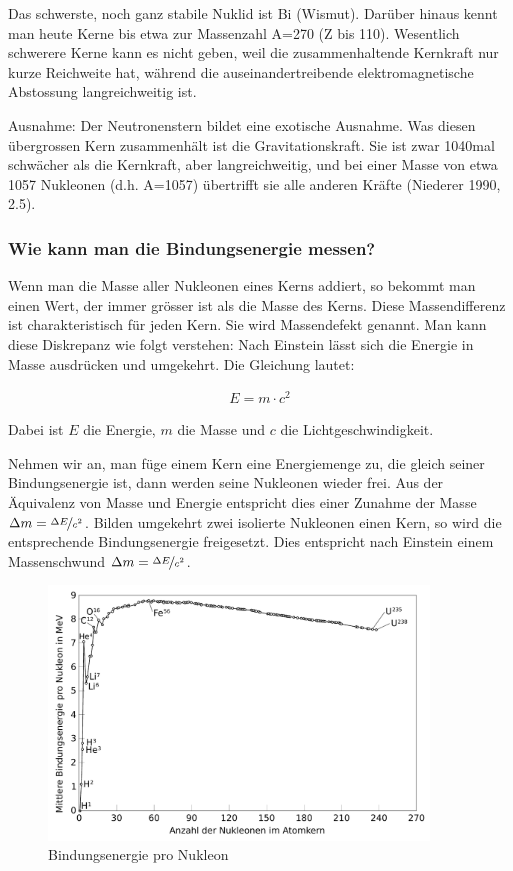\documentclass[12pt,a4paper,twoside]{article}
\begin{document}
Das schwerste, noch ganz stabile Nuklid ist Bi (Wismut).
Darüber hinaus kennt man heute Kerne bis etwa zur Massenzahl A=270 (Z bis 110).
Wesentlich schwerere Kerne kann es nicht geben, weil die zusammenhaltende Kernkraft
nur kurze Reichweite hat, während die auseinandertreibende elektromagnetische Abstossung langreichweitig ist.



Ausnahme: Der Neutronenstern bildet eine exotische Ausnahme. 
Was diesen übergrossen {\quotedblbase}Kern{\quotedblbase} zusammenhält 
ist die Gravitationskraft. Sie ist zwar 1040mal schwächer als die Kernkraft, 
aber langreichweitig, und bei einer Masse von etwa 1057 Nukleonen (d.h. A=1057)
übertrifft sie alle anderen Kräfte (Niederer 1990, 2.5).

\subsubsection*{Wie kann man die Bindungsenergie messen?}
Wenn man die Masse aller Nukleonen eines Kerns addiert, so bekommt man einen Wert, 
der immer grösser ist als die Masse des Kerns. Diese Massendifferenz ist charakteristisch 
für jeden Kern. Sie wird Massendefekt genannt. Man kann diese Diskrepanz wie folgt verstehen: 
Nach Einstein lässt sich die Energie in Masse ausdrücken und umgekehrt. Die Gleichung lautet:

\begin{eqnarray*}
	E=m\cdot c^2
\end{eqnarray*}

Dabei ist $E$ die Energie, $m$ die Masse und $c$ die Lichtgeschwindigkeit.

Nehmen wir an, man füge einem Kern eine Energiemenge zu, die gleich seiner Bindungsenergie ist,
dann werden seine Nukleonen wieder frei. Aus der Äquivalenz von Masse und Energie entspricht
dies einer Zunahme der Masse $\Delta m = \nicefrac{\Delta E}{c^2}$.
Bilden umgekehrt zwei isolierte Nukleonen einen Kern, so wird die entsprechende Bindungsenergie freigesetzt.
Dies entspricht nach Einstein einem Massenschwund  $\Delta m = \nicefrac{\Delta E}{c^2}$.

\begin{figure}[h]
	\centering
	\includegraphics[width=0.90\textwidth]{./Binding_energy_curve_-_common_isotopes_DE.pdf}
	\caption{Bindungsenergie pro Nukleon}
	\label{fig:Bindungsenergie_pro_Nukleon}
\end{figure}
\end{document}
